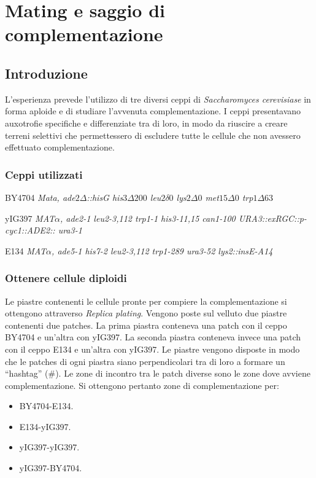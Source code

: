 \section*{Mating e saggio di complementazione}

	\subsection*{Introduzione}
	L'esperienza prevede l'utilizzo di tre diversi ceppi di \emph{Saccharomyces cerevisiase} in forma aploide e di studiare l'avvenuta complementazione.
	I ceppi presentavano auxotrofie specifiche e differenziate tra di loro, in modo da riuscire a creare terreni selettivi che permettessero di escludere tutte le cellule che non avessero effettuato complementazione.
	
		\subsubsection*{Ceppi utilizzati}
		\begin{center}
			BY4704 \emph{Mata, ade$2\Delta$::hisG his$3\Delta200$ leu$2\delta 0$ lys$2\Delta0$ met$15\Delta0$ trp$1\Delta63$}
		\end{center}
		\begin{center}
			yIG397 \emph{MAT$\alpha$, ade2-1 leu2-3,112 trp1-1 his3-11,15 can1-100 URA3::exRGC::p-cyc1::ADE2:: ura3-1}
		\end{center}
		\begin{center}
			E134 \emph{MAT$\alpha$, ade5-1 his7-2 leu2-3,112 trp1-289 ura3-52 lys2::insE-A14}
		\end{center}

		\subsubsection*{Ottenere cellule diploidi}
		Le piastre contenenti le cellule pronte per compiere la complementazione si ottengono attraverso \emph{Replica plating}.
		Vengono poste sul velluto due piastre contenenti due patches.
		La prima piastra conteneva una patch con il ceppo BY4704 e un'altra con yIG397.
		La seconda piastra conteneva invece una patch con il ceppo E134 e un'altra con yIG397.
		Le piastre vengono disposte in modo che le patches di ogni piastra siano perpendicolari tra di loro a formare un ``hashtag'' ($\#$).
		Le zone di incontro tra le patch diverse sono le zone dove avviene complementazione.
		Si ottengono pertanto zone di complementazione per:
		\begin{multicols}{4}
			\begin{itemize}
				\item BY4704-E134.
				\item E134-yIG397.
				\item yIG397-yIG397.
				\item yIG397-BY4704.
			\end{itemize}
		\end{multicols}

